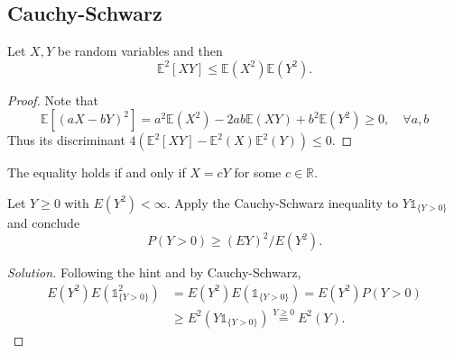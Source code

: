\documentclass[11pt,singlecolumn, openany, citestyle=authoryear]{elegantbook}
\begin{document}
\begin{CJK}{UTF8}{gbsn}
\subsection{Cauchy-Schwarz}
\begin{theorem}
    Let $X,Y$ be random variables and then 
    \begin{equation}
        \mathbb{E}^2[XY]\leqslant \mathbb{E}(X^2)\mathbb{E}(Y^2).
    \end{equation}
\end{theorem}
\begin{proof}
    Note that 
    $$
    \mathbb{E}[(aX-bY)^2]
    =a^2 \mathbb{E}(X^2)-2ab\mathbb{E}(XY) + b^2\mathbb{E}(Y^2)
    \geqslant 0 ,\quad \forall a,b
    $$
    Thus its discriminant 
    $
    4(\mathbb{E}^2[XY]- \mathbb{E}^2(X)\mathbb{E}^2(Y))\leqslant0.
    $
\end{proof}
\begin{remark}
    The equality holds if and only if $X=cY$ for some $c\in\mathbb{R}$.
\end{remark}
\begin{example}
    Let $Y \geqslant 0$ with $E(Y^2) < \infty$. Apply the
Cauchy-Schwarz inequality to $Y \mathds{1}_{\{Y >0\}}$ and conclude
$$
P(Y>0)\geqslant (EY)^2/E(Y^2).
$$
\end{example}
\begin{proof}[Solution]
    Following the hint and by Cauchy-Schwarz,
    \begin{align*}
        E(Y^2)E(\mathds{1}^2_{\{Y>0\}})&=
        E(Y^2)E(\mathds{1}_{\{Y>0\}})=E(Y^2)P(Y>0)\\
        &\geqslant E^2(Y\mathds{1}_{\{Y>0\}})\overset{Y\geqslant 0}{=}
        E^2(Y).
    \end{align*}
\end{proof}



\end{CJK}
\end{document}
